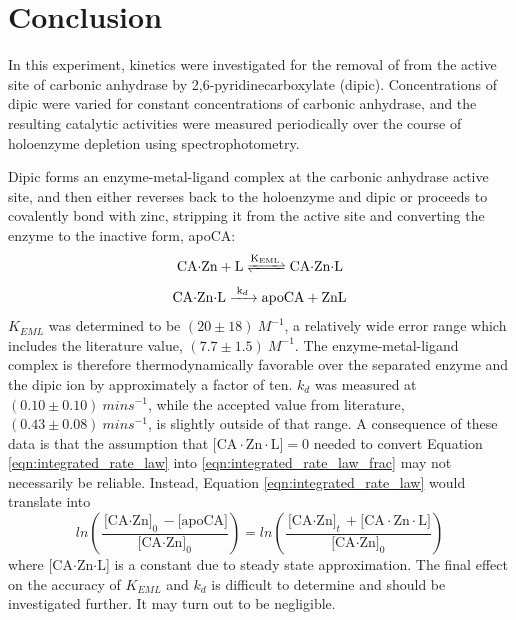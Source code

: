 \section{Conclusion}
In this experiment, kinetics were investigated for the removal of  from the active site of carbonic anhydrase by 2,6-pyridinecarboxylate (dipic). Concentrations of dipic were varied for constant concentrations of carbonic anhydrase, and the resulting catalytic activities were measured periodically over the course of holoenzyme depletion using spectrophotometry.

Dipic forms an enzyme-metal-ligand complex at the carbonic anhydrase active site, and then either reverses back to the holoenzyme and dipic or proceeds to covalently bond with zinc, stripping it from the active site and converting the enzyme to the inactive form, apoCA:
\begin{align*}
\ce{CA$\cdot$Zn + L
<=>[\ce{K_{EML}}]
CA$\cdot$Zn$\cdot$L}
\end{align*}
\begin{align*}\label{eqn:kd_reaction}
\ce{CA$\cdot$Zn$\cdot$L
->[\ce{k_{d}}]
apoCA + ZnL}
\end{align*}
$K_{EML}$ was determined to be $(20\pm{18}){\ }M^{-1}$, a relatively wide error range which includes the literature value, $(7.7\pm{1.5}){\ }M^{-1}$\cite{bib:easy_peasy_values}. The enzyme-metal-ligand complex is therefore thermodynamically favorable over the separated enzyme and the dipic ion by approximately a factor of ten. $k_{d}$ was measured at $(0.10\pm{0.10}){\ }mins^{-1}$, while the accepted value from literature, $(0.43\pm{0.08}){\ }mins^{-1}$, is slightly outside of that range. A consequence of these data is that the assumption that $\text{[CA$\cdot$Zn$\cdot$L]}=0$ needed to convert Equation \eqref{eqn:integrated_rate_law} into \eqref{eqn:integrated_rate_law_frac} may not necessarily be reliable. Instead, Equation \eqref{eqn:integrated_rate_law} would translate into
\begin{equation}\label{eqn:integrated_rate_law}
ln \left( \frac{\text{[CA$\cdot$Zn]}_0 - \text{[apoCA]}}{\text{[CA$\cdot$Zn]}_0} \right)
=
ln \left( \frac{\text{[CA$\cdot$Zn]}_t + \text{[CA$\cdot$Zn$\cdot$L]}}{\text{[CA$\cdot$Zn]}_0} \right)
\end{equation}
where [CA$\cdot$Zn$\cdot$L] is a constant due to steady state approximation. The final effect on the accuracy of $K_{EML}$ and $k_{d}$ is difficult to determine and should be investigated further. It may turn out to be negligible.

